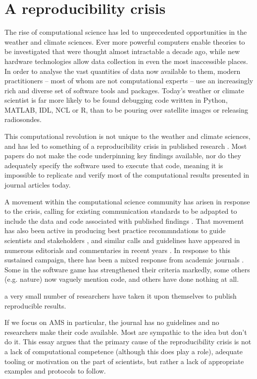 \section{A reproducibility crisis}
The rise of computational science has led to unprecedented opportunities in the weather and climate sciences. Ever more powerful computers enable theories to be investigated that were thought almost intractable a decade ago, while new hardware technologies allow data collection in even the most inaccessible places. In order to analyse the vast quantities of data now available to them, modern practitioners – most of whom are not computational experts – use an increasingly rich and diverse set of software tools and packages. Today's weather or climate scientist is far more likely to be found debugging code written in Python, MATLAB, IDL, NCL or R, than to be pouring over satellite images or releasing radiosondes. 

This computational revolution is not unique to the weather and climate sciences, and has led to something of a reproducibility crisis in published research \citep[e.g.][]{Peng2011}. Most papers do not make the code underpinning key findings available, nor do they adequately specify the software used to execute that code, meaning it is impossible to replicate and verify most of the computational results presented in journal articles today.

A movement within the computational science community has arisen in response to the crisis, calling for existing communication standards to be adpapted to include the data and code associated with published findings \citep[e.g.][]{Stodden2014}. That movement has also been active in producing best practice recommndations to guide scientists and stakeholders \citep{Stodden2014}, and similar calls and guidelines have appeared in numerous editorials and commentaries in recent years \citep[e.g.][]{Barnes2010,Merali2010,Ince2012}. In response to this sustained campaign, there has been a mixed response from academic journals \citep{Stodden2013}. Some in the software game has strengthened their criteria markedly, some others (e.g. nature) now vaguely mention code, and others have done nothing at all. 

a very small number of researchers have taken it upon themselves to publish reproducible results. 

If we focus on AMS in particular, the journal has no guidelines and no researchers make their code available. Most are sympathic to the idea but don't do it. This essay argues that the primary cause of the reproducibility crisis is not a lack of computational competence (although this does play a role), adequate tooling or motivation on the part of scientists, but rather a lack of appropriate examples and protocols to follow.

